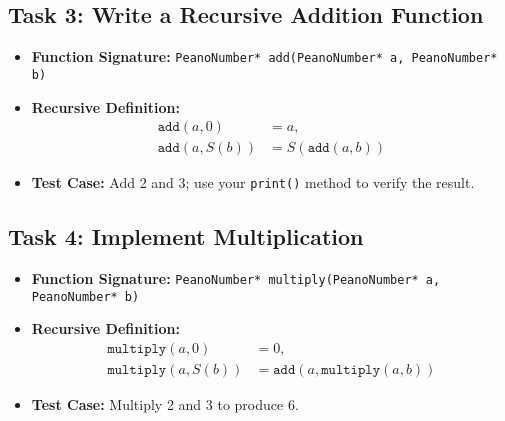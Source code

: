 \documentclass[12pt]{article}
\begin{document}
\subsection*{Task 3: Write a Recursive Addition Function}
\begin{itemize}[leftmargin=*]
    \item \textbf{Function Signature:} \texttt{PeanoNumber* add(PeanoNumber* a, PeanoNumber* b)}
    \item \textbf{Recursive Definition:}
    \[
    \begin{aligned}
    \texttt{add}(a, 0) &= a, \\
    \texttt{add}(a, S(b)) &= S(\texttt{add}(a, b))
    \end{aligned}
    \]
    \item \textbf{Test Case:} Add 2 and 3; use your \texttt{print()} method to verify the result.
\end{itemize}

\subsection*{Task 4: Implement Multiplication}
\begin{itemize}[leftmargin=*]
    \item \textbf{Function Signature:} \texttt{PeanoNumber* multiply(PeanoNumber* a, PeanoNumber* b)}
    \item \textbf{Recursive Definition:}
    \[
    \begin{aligned}
    \texttt{multiply}(a, 0) &= 0, \\
    \texttt{multiply}(a, S(b)) &= \texttt{add}(a, \texttt{multiply}(a, b))
    \end{aligned}
    \]
    \item \textbf{Test Case:} Multiply 2 and 3 to produce 6.
\end{itemize}
\end{document}
